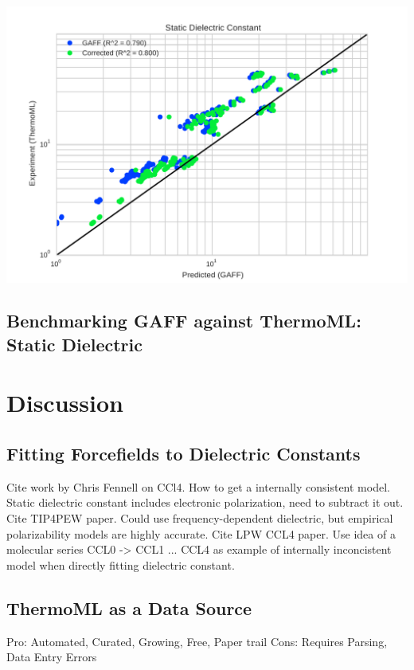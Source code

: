\documentclass[aps,pre,twocolumn,superscriptaddress]{revtex4-1}
\begin{document}
\includegraphics[width=\columnwidth]{./figures/dielectrics_thermoml.pdf}

\subsection{Benchmarking GAFF against ThermoML: Static Dielectric}


\section{Discussion}

\subsection{Fitting Forcefields to Dielectric Constants}

Cite work by Chris Fennell on CCl4.  How to get a internally consistent model.  Static dielectric constant includes electronic polarization, need to subtract it out.  Cite TIP4PEW paper.  Could use frequency-dependent dielectric, but empirical polarizability models are highly accurate.  Cite LPW CCL4 paper.  Use idea of a molecular series CCL0 -> CCL1 ... CCL4 as example of internally inconcistent model when directly fitting dielectric constant.

\subsection{ThermoML as a Data Source}

Pro: Automated, Curated, Growing, Free, Paper trail
Cons: Requires Parsing, Data Entry Errors
\end{document}
